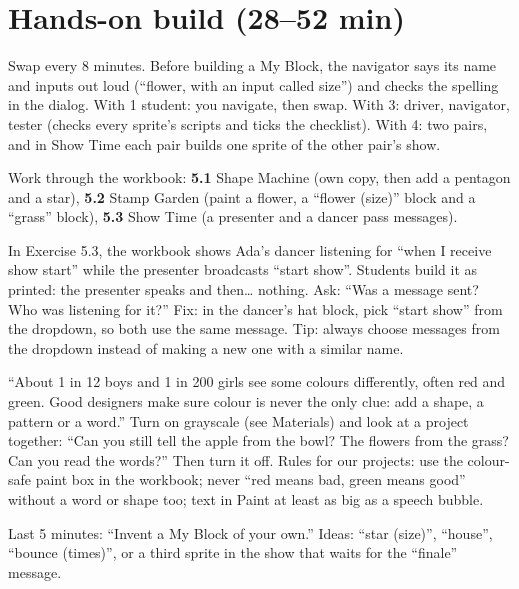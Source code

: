 \section{Hands-on build (28--52 min)}
\begin{pairroles}
Swap every 8 minutes. Before building a My Block, the navigator says its name and inputs out loud (\enquote{flower, with an input called size}) and checks the spelling in the dialog. With 1 student: you navigate, then swap. With 3: driver, navigator, tester (checks every sprite's scripts and ticks the checklist). With 4: two pairs, and in Show Time each pair builds one sprite of the other pair's show.
\end{pairroles}

Work through the workbook: \textbf{5.1} Shape Machine (own copy, then add a pentagon and a star), \textbf{5.2} Stamp Garden (paint a flower, a \enquote{flower (size)} block and a \enquote{grass} block), \textbf{5.3} Show Time (a presenter and a dancer pass messages).

\begin{bughunt}
In Exercise 5.3, the workbook shows Ada's dancer listening for \enquote{when I receive show start} while the presenter broadcasts \enquote{start show}. Students build it as printed: the presenter speaks and then\ldots{} nothing. Ask: \enquote{Was a message sent? Who was listening for it?} Fix: in the dancer's hat block, pick \enquote{start show} from the dropdown, so both use the same message. Tip: always choose messages from the dropdown instead of making a new one with a similar name.
\end{bughunt}

\begin{safety}
\enquote{About 1 in 12 boys and 1 in 200 girls see some colours differently, often red and green. Good designers make sure colour is never the only clue: add a shape, a pattern or a word.} Turn on grayscale (see Materials) and look at a project together: \enquote{Can you still tell the apple from the bowl? The flowers from the grass? Can you read the words?} Then turn it off. Rules for our projects: use the colour-safe paint box in the workbook; never \enquote{red means bad, green means good} without a word or shape too; text in Paint at least as big as a speech bubble.
\end{safety}

\begin{freebuild}
Last 5 minutes: \enquote{Invent a My Block of your own.} Ideas: \enquote{star (size)}, \enquote{house}, \enquote{bounce (times)}, or a third sprite in the show that waits for the \enquote{finale} message.
\end{freebuild}

